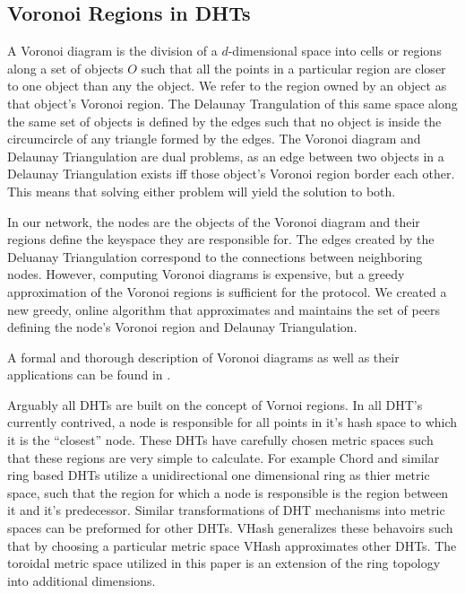 \documentclass{IEEEtran}
\begin{document}
\subsection{Voronoi Regions in DHTs}
A Voronoi diagram is the division of a $d$-dimensional space into cells or regions along a set of objects $O$ such that all the points in a particular region are closer to one object than any the object.  
We refer to the region owned by an object as that object's Voronoi region.
The Delaunay Trangulation of this same space along the same set of objects is defined by the edges such that no object is inside the circumcircle of any triangle formed by the edges\cite{geoalg}.  
The Voronoi diagram and Delaunay Triangulation are dual problems, as an edge between two objects in a Delaunay Triangulation exists iff those object's Voronoi region border each other.  
This means that solving either problem will yield the solution to both. 

In our network, the nodes are the objects of the Voronoi diagram and their regions define the keyspace they are responsible for.  The edges created by the Deluanay Triangulation correspond to the connections between neighboring nodes.  However, computing Voronoi diagrams is expensive, but a greedy approximation of the Voronoi regions is sufficient for the protocol.  We created a new greedy, online algorithm that approximates and maintains the set of peers defining the node's Voronoi region and Delaunay Triangulation.

A formal and thorough description of Voronoi diagrams as well as their applications can be found in \cite{aurenhammer1991voronoi}.

Arguably all DHTs are built on the concept of Vornoi regions. In all DHT's currently contrived, a node is responsible for all points in it's hash space to which it is the ``closest'' node. These DHTs have carefully chosen metric spaces such that these regions are very simple to calculate. For example Chord and similar ring based DHTs utilize a unidirectional one dimensional ring as thier metric space, such that the region for which a node is responsible is the region between it and it's predecessor. Similar transformations of DHT mechanisms into metric spaces can be preformed for other DHTs. VHash generalizes these behavoirs such that by choosing a particular metric space VHash approximates other DHTs. The toroidal metric space utilized in this paper is an extension of the ring topology into additional dimensions. 
\end{document}
